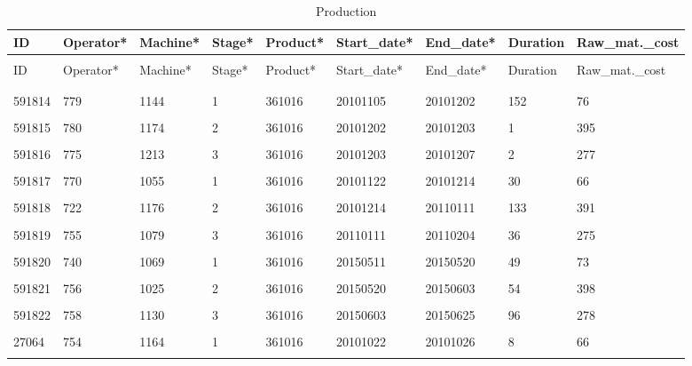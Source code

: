 \documentclass[letterpaper,12pt]{article}
\begin{document}
\begingroup
\renewcommand\arraystretch{0.5}
\begin{longtable}{p{1cm}p{1.5cm}p{1.5cm}p{1cm}p{1.5cm}p{1.8cm}p{1.6cm}p{1.3cm}p{2.2cm}}
        \caption{Production} \\
        ID & Operator* & Machine* & Stage* & Product* & Start\_date* & End\_date* & Duration & Raw\_mat.\_cost \\
        \endfirsthead \\
        ID & Operator* & Machine* & Stage* & Product* & Start\_date* & End\_date* & Duration & Raw\_mat.\_cost \\
        \endhead \\
        \hline \\
        591814 & 779 & 1144 & 1 & \color{red} 361016 & 20101105 & 20101202 & 152 & 76 \\
        \hline \\
        591815 & 780 & 1174 & 2 & \color{red} 361016 & 20101202 & 20101203 & 1 & 395 \\
        \hline \\
        591816 & 775 & 1213 & 3 & \color{red} 361016 & 20101203 & 20101207 & 2 & 277 \\
        \hline \\
        591817 & 770 & 1055 & 1 & \color{red} 361016 & 20101122 & 20101214 & 30 & 66 \\
        \hline \\
        591818 & 722 & \color{red} 1176 & 2 & \color{red} 361016 & 20101214 & 20110111 & 133 & 391 \\
        \hline \\
        591819 & 755 & 1079 & 3 & \color{red} 361016 & 20110111 & 20110204 & 36 & 275 \\
        \hline \\
        591820 & 740 & 1069 & 1 & \color{red} 361016 & 20150511 & 20150520 & 49 & 73 \\
        \hline \\
        591821 & 756 & 1025 & 2 & \color{red} 361016 & 20150520 & 20150603 & 54 & 398 \\
        \hline \\
        591822 & 758 & 1130 & 3 & \color{red} 361016 & 20150603 & 20150625 & 96 & 278 \\
        \hline \\
        27064 & 754 & 1164 & 1 & \color{red} 361016 & 20101022 & 20101026 & 8 & 66 \\
        \hline \\

\end{longtable}
\end{document}
